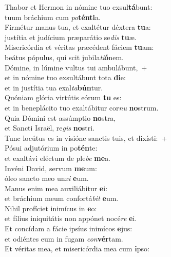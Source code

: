 \oddverse Thabor et Hermon in nómine tuo exsul\textbf{tá}bunt:~\*\\
\oddverse tuum bráchium cum \textit{po}\textbf{tén}\textbf{ti}a.\\
\evenverse Firmétur manus tua, et exaltétur déxtera \textbf{tu}a:~\*\\
\evenverse justítia et judícium præparátio se\textit{dis} \textbf{tu}æ.\\
\oddverse Misericórdia et véritas præcédent fáciem \textbf{tu}am:~\*\\
\oddverse beátus pópulus, qui scit jubila\textit{ti}\textbf{ó}nem.\\
\evenverse Dómine, in lúmine vultus tui ambulábunt,~+\\
\evenverse  et in nómine tuo exsultábunt tota \textbf{di}e:~\*\\
\evenverse et in justítia tua exal\textit{ta}\textbf{bún}tur.\\
\oddverse Quóniam glória virtútis eórum \textbf{tu} es:~\*\\
\oddverse et in beneplácito tuo exaltábitur cor\textit{nu} \textbf{no}strum.\\
\evenverse Quia Dómini est assúmptio \textbf{no}stra,~\*\\
\evenverse et Sancti Israël, re\textit{gis} \textbf{no}stri.\\
\oddverse Tunc locútus es in visióne sanctis tuis, et dixísti:~+\\
\oddverse  Pósui adjutórium in po\textbf{tén}te:~\*\\
\oddverse et exaltávi eléctum de ple\textit{be} \textbf{me}a.\\
\evenverse Invéni David, servum \textbf{me}um:~\*\\
\evenverse óleo sancto meo un\textit{xi} \textbf{e}um.\\
\oddverse Manus enim mea auxiliábitur \textbf{e}i:~\*\\
\oddverse et bráchium meum confortá\textit{bit} \textbf{e}um.\\
\evenverse Nihil profíciet inimícus in \textbf{e}o:~\*\\
\evenverse et fílius iniquitátis non appónet nocé\textit{re} \textbf{e}i.\\
\oddverse Et concídam a fácie ipsíus inimícos \textbf{e}jus:~\*\\
\oddverse et odiéntes eum in fugam \textit{con}\textbf{vér}tam.\\
\evenverse Et véritas mea, et misericórdia mea cum \textbf{i}pso:~\*\\
